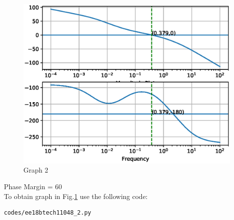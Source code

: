\begin{enumerate}[label=\thesection.\arabic*.,ref=\thesection.\theenumi]
\begin{figure}[!h]
\centering
  \includegraphics[width=\columnwidth]{./figs/ee18btech11048_2.eps}
  \caption{Graph 2}
  \label{fig: Graph 2}
\end{figure}
Phase Margin = 60\degree\\
To obtain graph in Fig.\ref{fig: Graph 2} use the following code:
\begin{lstlisting}
codes/ee18btech11048_2.py
\end{lstlisting}
\end{enumerate}
